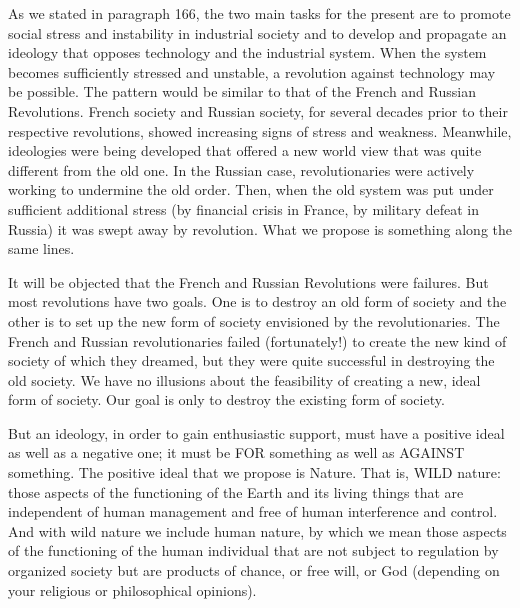  As we stated in paragraph 166, the two main tasks for the present are to promote social stress and instability in industrial society and to develop and propagate an ideology that opposes technology and the industrial system. When the system becomes sufficiently stressed and unstable, a revolution against technology may be possible. The pattern would be similar to that of the French and Russian Revolutions. French society and Russian society, for several decades prior to their respective revolutions, showed increasing signs of stress and weakness. Meanwhile, ideologies were being developed that offered a new world view that was quite different from the old one. In the Russian case, revolutionaries were actively working to undermine the old order. Then, when the old system was put under sufficient additional stress (by financial crisis in France, by military defeat in Russia) it was swept away by revolution. What we propose is something along the same lines.

 It will be objected that the French and Russian Revolutions were failures. But most revolutions have two goals. One is to destroy an old form of society and the other is to set up the new form of society envisioned by the revolutionaries. The French and Russian revolutionaries failed (fortunately!) to create the new kind of society of which they dreamed, but they were quite successful in destroying the old society. We have no illusions about the feasibility of creating a new, ideal form of society. Our goal is only to destroy the existing form of society.

 But an ideology, in order to gain enthusiastic support, must have a positive ideal as well as a negative one; it must be FOR something as well as AGAINST something. The positive ideal that we propose is Nature. That is, WILD nature: those aspects of the functioning of the Earth and its living things that are independent of human management and free of human interference and control. And with wild nature we include human nature, by which we mean those aspects of the functioning of the human individual that are not subject to regulation by organized society but are products of chance, or free will, or God (depending on your religious or philosophical opinions).


